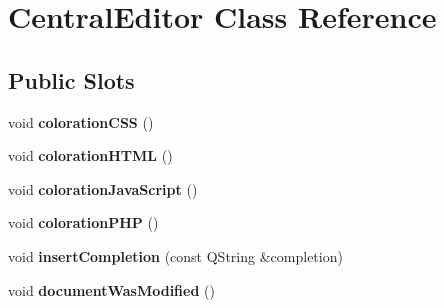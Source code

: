 \hypertarget{class_central_editor}{
\section{CentralEditor Class Reference}
\label{class_central_editor}
}
\subsection*{Public Slots}
\begin{DoxyCompactItemize}
\item 
\hypertarget{class_central_editor_ad1d108c6be93664b1fcd7a03e0508d7f}{
void {\bfseries colorationCSS} ()}
\label{class_central_editor_ad1d108c6be93664b1fcd7a03e0508d7f}

\item 
\hypertarget{class_central_editor_a32db89987afc45048cb78e258f67ff7f}{
void {\bfseries colorationHTML} ()}
\label{class_central_editor_a32db89987afc45048cb78e258f67ff7f}

\item 
\hypertarget{class_central_editor_afde617beb44ef17c426b22e2b7de3c6c}{
void {\bfseries colorationJavaScript} ()}
\label{class_central_editor_afde617beb44ef17c426b22e2b7de3c6c}

\item 
\hypertarget{class_central_editor_aa727e81e363dbd06c5a8b1dbaee62264}{
void {\bfseries colorationPHP} ()}
\label{class_central_editor_aa727e81e363dbd06c5a8b1dbaee62264}

\item 
\hypertarget{class_central_editor_a87821954f8d718c5157b26458eecac63}{
void {\bfseries insertCompletion} (const QString \&completion)}
\label{class_central_editor_a87821954f8d718c5157b26458eecac63}

\item 
\hypertarget{class_central_editor_a0cd5be2908fc0d56d86628d59a253bef}{
void {\bfseries documentWasModified} ()}
\label{class_central_editor_a0cd5be2908fc0d56d86628d59a253bef}

\end{DoxyCompactItemize}
